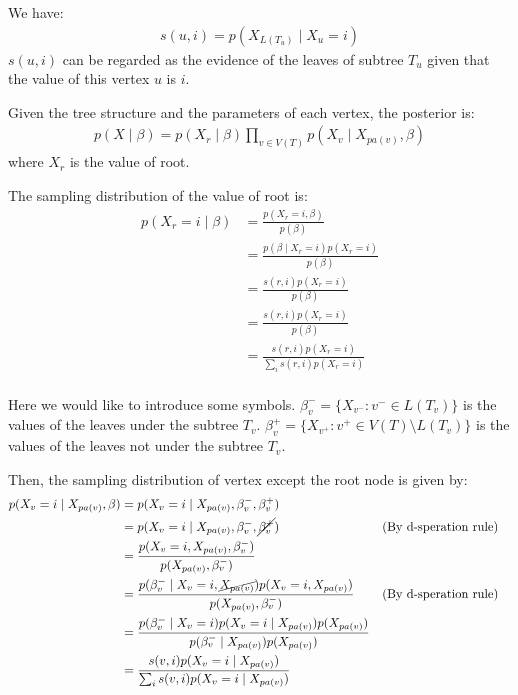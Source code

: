 \documentclass[12pt]{article}
\newenvironment{problem}[2][Problem]{\begin{trivlist}
\item[\hskip \labelsep {\bfseries #1}\hskip \labelsep {\bfseries #2.}]}{\end{trivlist}}
\begin{document}
\begin{problem}{2.5.15}

We have:
\begin{align*}
    s(u, i) = p(X_{L(T_u)} \mid X_u = i)
\end{align*}
$s(u,i)$ can be regarded as the evidence of the leaves of subtree $T_u$ given that
the value of this vertex $u$ is $i$.

Given the tree structure and the parameters of each vertex, the posterior is:
\begin{align*}
    p(X\mid \beta) = p(X_r\mid \beta)\prod_{v\in V(T)} p(X_v\mid X_{pa(v)}, \beta)
\end{align*}
where $X_r$ is the value of root.

The sampling distribution of the value of root is:
\begin{align*}
    p(X_r = i\mid \beta) &= \frac{p(X_r = i, \beta)}{p(\beta)} \\
    &= \frac{p(\beta \mid X_r =i)p(X_r =i)}{p(\beta)} \\
    &= \frac{s(r,i)p(X_r =i)}{p(\beta)} \\
    &= \frac{s(r,i)p(X_r =i)}{p(\beta)} \\
    &= \frac{s(r,i)p(X_r =i)}{\sum_{i}s(r,i)p(X_r =i)} \\
\end{align*}

Here we would like to introduce some symbols. 
$\beta^{-}_{v} = \{X_{v^{-}}: v^{-} \in L(T_v)\}$ is the values of the leaves
under the subtree $T_v$.
$\beta^{+}_{v} = \{X_{v^{+}}: v^{+} \in V(T) \setminus L(T_v)\}$ is the values of
the leaves not under the subtree $T_v$.

Then, the sampling distribution of vertex except the root node is given by:
\begin{align*}
    p(X_v = i\mid X_{pa(v)}, \beta)
    &= p(X_v = i\mid X_{pa(v)}, \beta^{-}_{v}, \beta^{+}_{v}) \\
    &= p(X_v = i\mid X_{pa(v)}, \beta^{-}_{v}, \cancel{\beta^{+}_{v}}) && \text{(By d-speration rule)}\\
    &= \frac{p(X_v = i, X_{pa(v)}, \beta^{-}_{v})}{p(X_{pa(v)}, \beta^{-}_{v})} \\
    &= \frac{p(\beta^{-}_{v}\mid X_v = i, \cancel{X_{pa(v)}})p(X_v = i, X_{pa(v)})}
        {p(X_{pa(v)}, \beta^{-}_{v})} && \text{(By d-speration rule)}\\
    &= \frac{p(\beta^{-}_{v}\mid X_v = i)p(X_v = i\mid X_{pa(v)})p(X_{pa(v)})}
        {p(\beta^{-}_{v}\mid X_{pa(v)})p(X_{pa(v)})} \\
    &= \frac{s(v,i)p(X_v = i\mid X_{pa(v)})}
            {\sum_{i}s(v,i)p(X_v = i\mid X_{pa(v)})}
\end{align*}


\end{problem}
\end{document}
